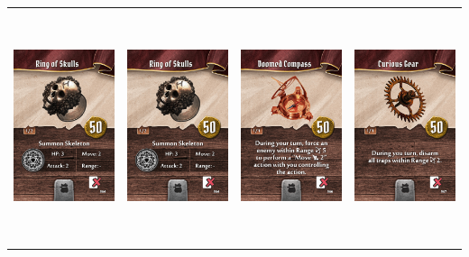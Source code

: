 \documentclass{minimal}
\begin{document}
{\begin{longtable}{llll}
\includegraphics[width=44mm,height=68mm]{./64-151/gh-123-ring-of-skulls.png} &
\includegraphics[width=44mm,height=68mm]{./64-151/gh-123-ring-of-skulls.png} &
\includegraphics[width=44mm,height=68mm]{./64-151/gh-124-doomed-compass.png} &
\includegraphics[width=44mm,height=68mm]{./64-151/gh-125-curious-gear.png}\\ 

\end{longtable}}
\end{document}
